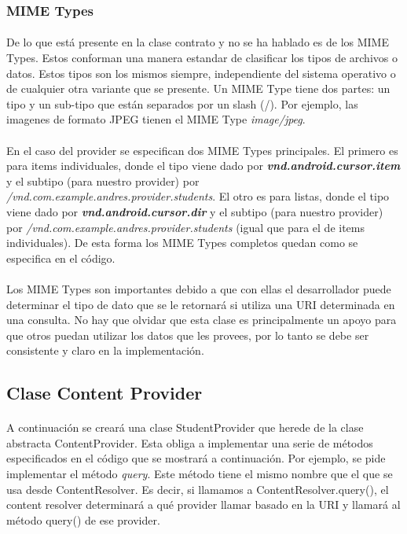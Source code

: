 \documentclass[10pt]{extarticle}
\begin{document}
\subsubsection{MIME Types}

\paragraph{}
De lo que está presente en la clase contrato y no se ha hablado es de los MIME Types. Estos conforman una manera estandar de clasificar los tipos de archivos o datos. Estos tipos son los mismos siempre, independiente del sistema operativo o de cualquier otra variante que se presente. Un MIME Type tiene dos partes: un tipo y un sub-tipo que están separados por un slash (/). Por ejemplo, las imagenes de formato JPEG tienen el MIME Type \textit{image/jpeg}.

\paragraph{}
En el caso del provider se especifican dos MIME Types principales. El primero es para items individuales, donde el tipo viene dado por \textit{\textbf{vnd.android.cursor.item}} y el subtipo (para nuestro provider) por \textit{/vnd.com.example.andres.provider.students}. El otro es para listas, donde el tipo viene dado por \textit{\textbf{vnd.android.cursor.dir}} y el subtipo (para nuestro provider) por   \textit{/vnd.com.example.andres.provider.students} (igual que para el de items individuales). De esta forma los MIME Types completos quedan como se especifica en el código.

\paragraph{}
Los MIME Types son importantes debido a que con ellas el desarrollador puede determinar el tipo de dato que se le retornará si utiliza una URI determinada en una consulta. No hay que olvidar que esta clase es principalmente un apoyo para que otros puedan utilizar los datos que les provees, por lo tanto se debe ser consistente y claro en la implementación.

\subsection{Clase Content Provider}

\paragraph{}
A continuación se creará una clase StudentProvider que herede de la clase abstracta ContentProvider. Esta obliga a implementar una serie de métodos especificados en el código que se mostrará a continuación. Por ejemplo, se pide implementar el método \textit{query}. Este método tiene el mismo nombre que el que se usa desde ContentResolver. Es decir, si llamamos a ContentResolver.query(), el content resolver determinará a qué provider llamar basado en la URI y llamará al método query() de ese provider.
\end{document}
